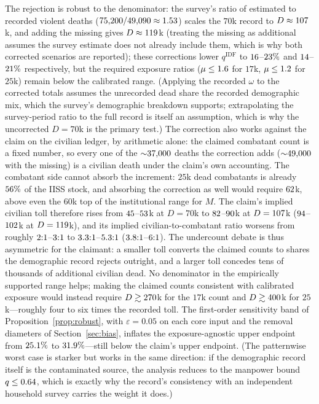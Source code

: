 The rejection is robust to the denominator: the survey's ratio of estimated to recorded violent deaths ($75{,}200/49{,}090\approx 1.53{}$) scales the $70$k record to $D\approx 107{}$k, and adding the missing gives $D\approx 119{}$k (treating the missing as additional assumes the survey estimate does not already include them, which is why both corrected scenarios are reported); these corrections lower $q^{\mathrm{IDF}}$ to $16{}$--$23{}\%$ and $14{}$--$21{}\%$ respectively, but the required exposure ratios ($\mu\le 1.6{}$ for $17$k, $\mu\le 1.2{}$ for $25$k) remain below the calibrated range. (Applying the recorded $\omega$ to the corrected totals assumes the unrecorded dead share the recorded demographic mix, which the survey's demographic breakdown supports; extrapolating the survey-period ratio to the full record is itself an assumption, which is why the uncorrected $D=70$k is the primary test.) The correction also works against the claim on the civilian ledger, by arithmetic alone: the claimed combatant count is a fixed number, so every one of the ${\sim}37{,}000{}$ deaths the correction adds (${\sim}49{,}000{}$ with the missing) is a civilian death under the claim's own accounting. The combatant side cannot absorb the increment: $25$k dead combatants is already $56{}\%$ of the IISS stock, and absorbing the correction as well would require $62{}$k, above even the $60$k top of the institutional range for $M$. The claim's implied civilian toll therefore rises from $45{}$--$53{}$k at $D=70$k to $82{}$--$90{}$k at $D=107{}$k ($94{}$--$102{}$k at $D=119{}$k), and its implied civilian-to-combatant ratio worsens from roughly $2{}{:}1$--$3{}{:}1$ to $3.3{}{:}1$--$5.3{}{:}1$ ($3.8{}{:}1$--$6{}{:}1$). The undercount debate is thus asymmetric for the claimant: a smaller toll converts the claimed counts to shares the demographic record rejects outright, and a larger toll concedes tens of thousands of additional civilian dead. No denominator in the empirically supported range helps; making the claimed counts consistent with calibrated exposure would instead require $D\gtrsim 270{}$k for the $17$k count and $D\gtrsim 400{}$k for $25$k---roughly four to six times the recorded toll. The first-order sensitivity band of Proposition~\ref{prop:robust}, with $\varepsilon=0.05$ on each core input and the removal diameters of Section~\ref{sec:bias}, inflates the exposure-agnostic upper endpoint from $25.1{}\%$ to $31.9{}\%$---still below the claim's upper endpoint. (The patternwise worst case is starker but works in the same direction: if the demographic record itself is the contaminated source, the analysis reduces to the manpower bound $q\le 0.64{}$, which is exactly why the record's consistency with an independent household survey carries the weight it does.)

